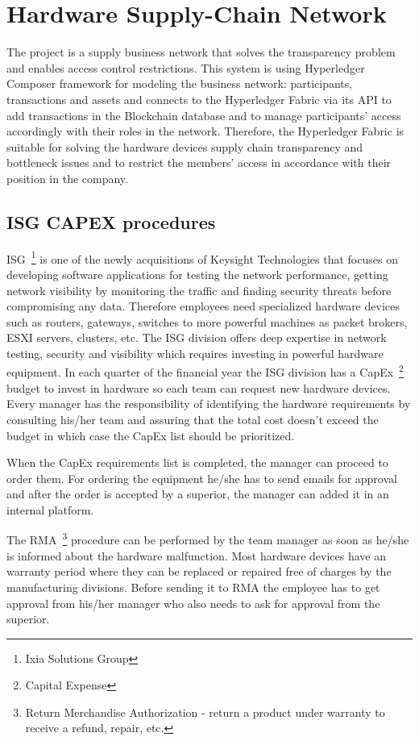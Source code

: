 \chapter{Hardware Supply-Chain Network}
\label{chapter:chapter4}
The \textbf{\emph{\project}} project is a supply business network that solves the transparency problem and enables access control restrictions.
This system is using Hyperledger Composer framework for modeling the business network: participants, transactions and assets and connects to the Hyperledger Fabric via its API to add transactions in the Blockchain database and to manage participants' access accordingly with their roles in the network.
Therefore, the Hyperledger Fabric is suitable for solving the hardware devices supply chain transparency and bottleneck issues and to restrict the members' access in accordance with their position in the company.


\section{ISG CAPEX procedures}
\label{sec:chapter4-section1}

ISG~\footnote{Ixia Solutions Group} is one of the newly acquisitions of Keysight Technologies that focuses on developing software applications for testing the network performance, getting network visibility by monitoring the traffic and finding security threats before compromising any data.
Therefore employees need specialized hardware devices such as routers, gateways, switches to more powerful machines as packet brokers, ESXI servers, clusters, etc.
The ISG division offers deep expertise in network testing, security and visibility which requires investing in powerful hardware equipment.
In each quarter of the financial year the ISG division has a CapEx~\footnote{Capital Expense} budget to invest in hardware so each team can request new hardware devices.
Every manager has the responsibility of identifying the hardware requirements by consulting his/her team and assuring that the total cost doesn't exceed the budget in which case the CapEx list should be prioritized.

When the CapEx requirements list is completed, the manager can proceed to order them.
For ordering the equipment he/she has to send emails for approval and after the order is accepted by a superior, the manager can added it in an internal platform.

The RMA~\footnote{Return Merchandise Authorization - return a product under warranty to receive a refund, repair, etc.} procedure can be performed by the team manager as soon as he/she is informed about the hardware malfunction. Most hardware devices have an warranty period where they can be replaced or repaired free of charges by the manufacturing divisions. Before sending it to RMA the employee has to get approval from his/her manager who also needs to ask for approval from the superior.

